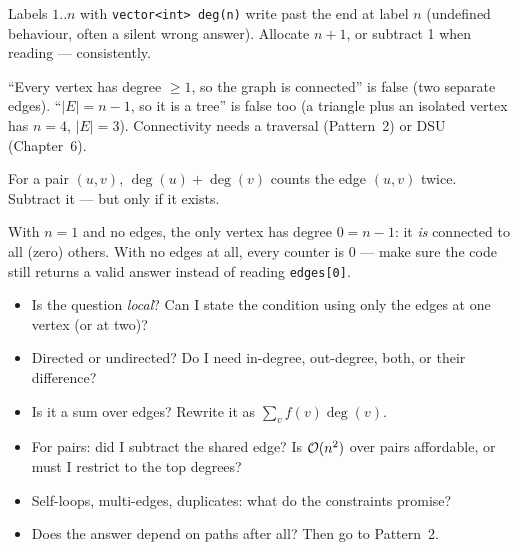\begin{warningbox}
Labels $1..n$ with \texttt{vector<int> deg(n)} write past the end at label $n$ (undefined behaviour, often a silent wrong answer). Allocate $n+1$, or subtract 1 when reading --- consistently.
\end{warningbox}

\begin{warningbox}
``Every vertex has degree $\ge 1$, so the graph is connected'' is false (two separate edges). ``$|E| = n-1$, so it is a tree'' is false too (a triangle plus an isolated vertex has $n=4$, $|E|=3$). Connectivity needs a traversal (Pattern~2) or DSU (Chapter~6).
\end{warningbox}

\begin{warningbox}
For a pair $(u,v)$, $\deg(u)+\deg(v)$ counts the edge $(u,v)$ twice. Subtract it --- but only if it exists.
\end{warningbox}

\begin{warningbox}
With $n = 1$ and no edges, the only vertex has degree $0 = n-1$: it \emph{is} connected to all (zero) others. With no edges at all, every counter is 0 --- make sure the code still returns a valid answer instead of reading \texttt{edges[0]}.
\end{warningbox}

\begin{checklistbox}
\begin{itemize}[leftmargin=*]
    \item[$\square$] Is the question \emph{local}? Can I state the condition using only the edges at one vertex (or at two)?
    \item[$\square$] Directed or undirected? Do I need in-degree, out-degree, both, or their difference?
    \item[$\square$] Is it a sum over edges? Rewrite it as $\sum_v f(v)\deg(v)$.
    \item[$\square$] For pairs: did I subtract the shared edge? Is $\mathcal{O}(n^2)$ over pairs affordable, or must I restrict to the top degrees?
    \item[$\square$] Self-loops, multi-edges, duplicates: what do the constraints promise?
    \item[$\square$] Does the answer depend on paths after all? Then go to Pattern~2.
\end{itemize}
\end{checklistbox}
